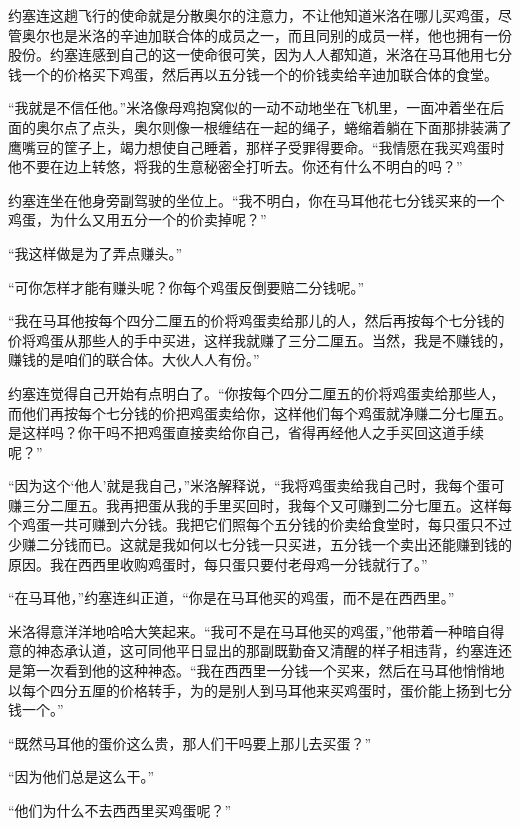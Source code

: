     约塞连这趟飞行的使命就是分散奥尔的注意力，不让他知道米洛在哪儿买鸡蛋，尽管奥尔也是米洛的辛迪加联合体的成员之一，而且同别的成员一样，他也拥有一份股份。约塞连感到自己的这一使命很可笑，因为人人都知道，米洛在马耳他用七分钱一个的价格买下鸡蛋，然后再以五分钱一个的价钱卖给辛迪加联合体的食堂。
 


    “我就是不信任他。”米洛像母鸡抱窝似的一动不动地坐在飞机里，一面冲着坐在后面的奥尔点了点头，奥尔则像一根缠结在一起的绳子，蜷缩着躺在下面那排装满了鹰嘴豆的筐子上，竭力想使自己睡着，那样子受罪得要命。“我情愿在我买鸡蛋时他不要在边上转悠，将我的生意秘密全打听去。你还有什么不明白的吗？”

    约塞连坐在他身旁副驾驶的坐位上。“我不明白，你在马耳他花七分钱买来的一个鸡蛋，为什么又用五分一个的价卖掉呢？”

    “我这样做是为了弄点赚头。”

    “可你怎样才能有赚头呢？你每个鸡蛋反倒要赔二分钱呢。”

    “我在马耳他按每个四分二厘五的价将鸡蛋卖给那儿的人，然后再按每个七分钱的价将鸡蛋从那些人的手中买进，这样我就赚了三分二厘五。当然，我是不赚钱的，赚钱的是咱们的联合体。大伙人人有份。”

    约塞连觉得自己开始有点明白了。“你按每个四分二厘五的价将鸡蛋卖给那些人，而他们再按每个七分钱的价把鸡蛋卖给你，这样他们每个鸡蛋就净赚二分七厘五。是这样吗？你干吗不把鸡蛋直接卖给你自己，省得再经他人之手买回这道手续呢？”

    “因为这个‘他人’就是我自己，”米洛解释说，“我将鸡蛋卖给我自己时，我每个蛋可赚三分二厘五。我再把蛋从我的手里买回时，我每个又可赚到二分七厘五。这样每个鸡蛋一共可赚到六分钱。我把它们照每个五分钱的价卖给食堂时，每只蛋只不过少赚二分钱而已。这就是我如何以七分钱一只买进，五分钱一个卖出还能赚到钱的原因。我在西西里收购鸡蛋时，每只蛋只要付老母鸡一分钱就行了。”

    “在马耳他，”约塞连纠正道，“你是在马耳他买的鸡蛋，而不是在西西里。”

    米洛得意洋洋地哈哈大笑起来。“我可不是在马耳他买的鸡蛋，”他带着一种暗自得意的神态承认道，这可同他平日显出的那副既勤奋又清醒的样子相违背，约塞连还是第一次看到他的这种神态。“我在西西里一分钱一个买来，然后在马耳他悄悄地以每个四分五厘的价格转手，为的是别人到马耳他来买鸡蛋时，蛋价能上扬到七分钱一个。”

    “既然马耳他的蛋价这么贵，那人们干吗要上那儿去买蛋？”

    “因为他们总是这么干。”

    “他们为什么不去西西里买鸡蛋呢？”

